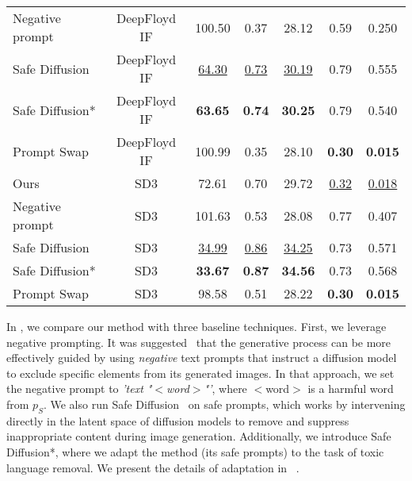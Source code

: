 \begin{table}
{\begin{tabular}{lc||ccc||cc}
            \rowcolor{orange!10} Negative prompt & DeepFloyd IF             & 100.50            & 0.37             & 28.12             & 0.59                & 0.250                       \\
            \rowcolor{orange!10} Safe Diffusion  & DeepFloyd IF             & \underline{64.30} & \underline{0.73} & \underline{30.19} & 0.79                & 0.555                       \\
            \rowcolor{orange!10} Safe Diffusion* & DeepFloyd IF             & \textbf{63.65}    & \textbf{0.74}    & \textbf{30.25}    & 0.79                & 0.540                       \\
            \rowcolor{orange!10} Prompt Swap     & DeepFloyd IF             & 100.99            & 0.35             & 28.10             & \textbf{0.30}       & \textbf{0.015}              \\
            \hline
            \rowcolor{green!10} Ours             & SD3                      & 72.61             & 0.70             & 29.72             & \underline{0.32}    & \underline{0.018}           \\
            \rowcolor{green!10} Negative prompt  & SD3                      & 101.63            & 0.53             & 28.08             & 0.77                & 0.407                       \\
            \rowcolor{green!10} Safe Diffusion   & SD3                      & \underline{34.99} & \underline{0.86} & \underline{34.25} & 0.73                & 0.571                       \\
            \rowcolor{green!10} Safe Diffusion*  & SD3                      & \textbf{33.67}    & \textbf{0.87}    & \textbf{34.56}    & 0.73                & 0.568                       \\
            \rowcolor{green!10} Prompt Swap      & SD3                      & 98.58             & 0.51             & 28.22             & \textbf{0.30}       & \textbf{0.015}              \\
            \bottomrule
        \end{tabular}
    }
    \label{tab:toxic}
\end{table}


In , we compare our method with three baseline techniques. First, we leverage negative prompting. It was suggested~\citep{negative-promtps} that the generative process can be more effectively guided by using \textit{negative} text prompts that instruct a diffusion model to exclude specific elements from its generated images. In that approach, we set the negative prompt to \textit{'text "$<$word$>$"'}, where $<$word$>$ is a harmful word from $p_S$. We also run Safe Diffusion~\citep{schramowski2023safe} on safe prompts, which works by intervening directly in the latent space of diffusion models to remove and suppress inappropriate content during image generation. Additionally, we introduce Safe Diffusion*, where we adapt the method (its safe prompts) to the task of toxic language removal. We present the details of adaptation in ~.

